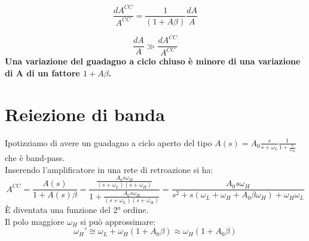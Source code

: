 \documentclass[a4paper, 12pt]{book}
\begin{document}
\begin{equation*}
    \frac{dA^{CC}}{A^{CC}}=\frac{1}{(1+A\beta)}\frac{dA}{A}
\end{equation*}

\begin{equation*}
    \frac{dA}{A}\gg\frac{dA^{CC}}{A^{CC}}
\end{equation*}
\textbf{Una variazione del guadagno a ciclo chiuso è minore di una variazione di A di un fattore $1+A\beta$.}

\section*{Reiezione di banda}
Ipotizziamo di avere un guadagno a ciclo aperto del tipo $A(s)= A_{0}\frac{s}{s+\omega_{L}}\frac{1}{1+\frac{s}{\omega_{H}}}$ che è band-pass.
\\Inserendo l'amplificatore in una rete di retroazione si ha:
\begin{equation*}
    A^{CC}=\frac{A(s)}{1+A(s)\beta}=\frac{\frac{A_{0}s\omega_{H}}{(s+\omega_{L})(s+\omega_{H})}}{1+\frac{A_{0}s\omega_{H}}{(s+\omega_{L})(s+\omega_{H})}}=
    \frac{A_{0}s\omega_{H}}{s^2+s(\omega_{L}+\omega_{H}+A_{0}\beta\omega_{H})+\omega_{H}\omega_{L}}
\end{equation*}
È diventata una funzione del 2° ordine.
\\Il polo maggiore $\omega_{H}$ si può approssimare:
\begin{equation*}
    \omega_{H}'\cong\omega_{L}+\omega_{H}(1+A_{0}\beta)\approx\omega_{H}(1+A_{0}\beta)
\end{equation*}
\end{document}
